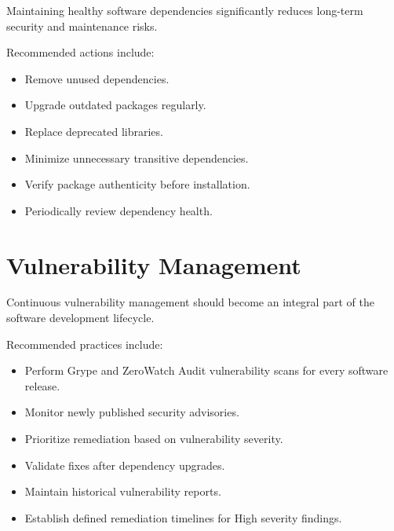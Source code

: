 Maintaining healthy software dependencies significantly reduces long-term security and maintenance risks.

Recommended actions include:
\begin{itemize}
\item Remove unused dependencies.
\item Upgrade outdated packages regularly.
\item Replace deprecated libraries.
\item Minimize unnecessary transitive dependencies.
\item Verify package authenticity before installation.
\item Periodically review dependency health.
\end{itemize}

\vspace{0.4cm}


\section{Vulnerability Management}

Continuous vulnerability management should become an integral part of the software development lifecycle.

Recommended practices include:
\begin{itemize}
\item Perform Grype and ZeroWatch Audit vulnerability scans for every software release.
\item Monitor newly published security advisories.
\item Prioritize remediation based on vulnerability severity.
\item Validate fixes after dependency upgrades.
\item Maintain historical vulnerability reports.
\item Establish defined remediation timelines for High severity findings.
\end{itemize}

\vspace{0.4cm}


